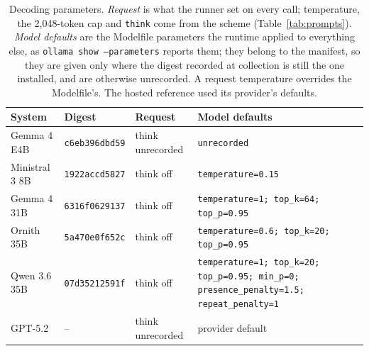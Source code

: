 \begin{table}[htbp]
\centering
\caption{Decoding parameters. \emph{Request} is what the runner set on every call; temperature, the 2{,}048-token cap and \texttt{think} come from the scheme (Table~\ref{tab:prompts}). \emph{Model defaults} are the Modelfile parameters the runtime applied to everything else, as \texttt{ollama show --parameters} reports them; they belong to the manifest, so they are given only where the digest recorded at collection is still the one installed, and are otherwise unrecorded. A request temperature overrides the Modelfile's. The hosted reference used its provider's defaults.}
\label{tab:decoding}
\small
\begin{tabular}{lllp{}}
\toprule
\textbf{System} & \textbf{Digest} & \textbf{Request} & \textbf{Model defaults} \\
\midrule
  Gemma 4 E4B & \texttt{c6eb396dbd59} & think unrecorded & \texttt{unrecorded} \\
  Ministral 3 8B & \texttt{1922accd5827} & think off & \texttt{temperature=0.15} \\
  Gemma 4 31B & \texttt{6316f0629137} & think off & \texttt{temperature=1; top\_k=64; top\_p=0.95} \\
  Ornith 35B & \texttt{5a470e0f652c} & think off & \texttt{temperature=0.6; top\_k=20; top\_p=0.95} \\
  Qwen 3.6 35B & \texttt{07d35212591f} & think off & \texttt{temperature=1; top\_k=20; top\_p=0.95; min\_p=0; presence\_penalty=1.5; repeat\_penalty=1} \\
  GPT-5.2 & -- & think unrecorded & provider default \\
\bottomrule
\end{tabular}
\end{table}
